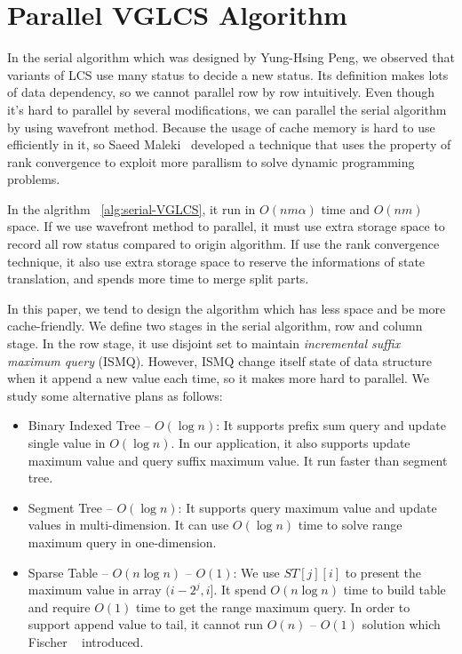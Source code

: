 \section{Parallel VGLCS Algorithm} %
\label{sec:parallelSerial}

In the serial algorithm which was designed by Yung-Hsing Peng, we observed that variants of LCS use many status to decide a new status. Its definition makes lots of data dependency, so we cannot parallel row by row intuitively. Even though it's hard to parallel by several modifications, we can parallel the serial algorithm by using wavefront method. Because the usage of cache  memory is hard to use efficiently in it, so Saeed Maleki~\cite{saeed} developed a technique that uses the property of rank convergence to exploit more parallism to solve dynamic programming problems.



In the algrithm ~\ref{alg:serial-VGLCS}, it run in $O(nm \alpha)$ time and $O(nm)$ space. If we use wavefront method to parallel, it must use extra storage space to record all row status compared to origin algorithm. If use the rank convergence technique, it also use extra storage space to reserve the informations of state translation, and spends more time to merge split parts.

In this paper, we tend to design the algorithm which has less space and be more cache-friendly. We define two stages in the serial algorithm, row and column stage. In the row stage, it use disjoint set to maintain \emph{incremental suffix maximum query} (ISMQ).  However, ISMQ change itself state of data structure when it append a new value each time, so it makes more hard to parallel.  We study some alternative plans as follows:

\begin{itemize}
  \item Binary Indexed Tree -- $O(\log n)$: It supports prefix sum query and update single value in $O(\log n)$.  In our application, it also supports update maximum value and query suffix maximum value.  It run faster than segment tree.
  \item Segment Tree -- $O(\log n)$: It supports query maximum value and update values in multi-dimension.  It can use $O(\log n)$ time to solve range maximum query in one-dimension.
  \item Sparse Table -- $O(n \log n)$ -- $O(1)$:
    We use $ST[j][i]$ to present the maximum value in array $(i-2^j,i]$. It spend $O(n \log n)$ time to build table and require $O(1)$ time to get the range maximum query. In order to support append value to tail, it cannot run $O(n)$ -- $O(1)$ solution which Fischer ~\cite{fischer} introduced.
\end{itemize}

